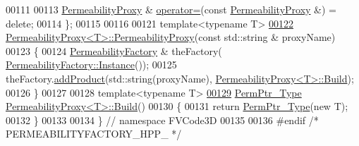 \begin{DoxyCode}
00111 
00113     \hyperlink{classFVCode3D_1_1PermeabilityProxy}{PermeabilityProxy} & \hyperlink{classFVCode3D_1_1PermeabilityFactory_a0f37ae69832f386ad197f95f81825eb3}{operator=}(\textcolor{keyword}{const} 
      \hyperlink{classFVCode3D_1_1PermeabilityProxy}{PermeabilityProxy} &) = \textcolor{keyword}{delete};
00114 \};
00115 
00116 
00121 \textcolor{keyword}{template}<\textcolor{keyword}{typename} T>
\hypertarget{PermeabilityFactory_8hpp_source.tex_l00122}{}\hyperlink{classFVCode3D_1_1PermeabilityProxy_ad32fd95d4858deec225f041a7e4cbfc1}{00122} \hyperlink{classFVCode3D_1_1PermeabilityProxy_aa69972af9cb50c927f4238edd41b0ba5}{PermeabilityProxy<T>::PermeabilityProxy}(\textcolor{keyword}{const} std::string & 
      proxyName)
00123 \{
00124     \hyperlink{classFVCode3D_1_1PermeabilityFactory}{PermeabilityFactory} & theFactory(
      \hyperlink{classFVCode3D_1_1PermeabilityFactory_a4bf654c1bec870030dbfe0a8dfbc721e}{PermeabilityFactory::Instance}());
00125     theFactory.\hyperlink{classFVCode3D_1_1PermeabilityFactory_a3a160511216d3258029df8b84a7c322d}{addProduct}(std::string(proxyName),
      \hyperlink{classFVCode3D_1_1PermeabilityProxy}{PermeabilityProxy<T>::Build});
00126 \}
00127 
00128 \textcolor{keyword}{template}<\textcolor{keyword}{typename} T>
\hypertarget{PermeabilityFactory_8hpp_source.tex_l00129}{}\hyperlink{classFVCode3D_1_1PermeabilityProxy_aa5d0847371daa4a99c080e7ba317d965}{00129} \hyperlink{namespaceFVCode3D_aee5ae48a57366603109f90f526a645b1}{PermPtr\_Type} \hyperlink{classFVCode3D_1_1PermeabilityProxy_aa5d0847371daa4a99c080e7ba317d965}{PermeabilityProxy<T>::Build}()
00130 \{
00131     \textcolor{keywordflow}{return} \hyperlink{namespaceFVCode3D_aee5ae48a57366603109f90f526a645b1}{PermPtr\_Type}(\textcolor{keyword}{new} T);
00132 \}
00133 
00134 \} \textcolor{comment}{// namespace FVCode3D}
00135 
00136 \textcolor{preprocessor}{#endif }\textcolor{comment}{/* PERMEABILITYFACTORY\_HPP\_ */}\textcolor{preprocessor}{}
\end{DoxyCode}
